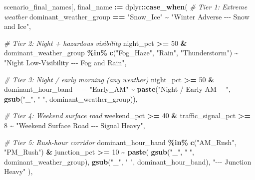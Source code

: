 \documentclass[
]{article}
\newenvironment{Shaded}{\begin{snugshade}}{\end{snugshade}}
\newcommand{\CommentTok}[1]{\textcolor[rgb]{0.56,0.35,0.01}{\textit{#1}}}
\newcommand{\DecValTok}[1]{\textcolor[rgb]{0.00,0.00,0.81}{#1}}
\newcommand{\FunctionTok}[1]{\textcolor[rgb]{0.13,0.29,0.53}{\textbf{#1}}}
\newcommand{\NormalTok}[1]{#1}
\newcommand{\SpecialCharTok}[1]{\textcolor[rgb]{0.81,0.36,0.00}{\textbf{#1}}}
\newcommand{\StringTok}[1]{\textcolor[rgb]{0.31,0.60,0.02}{#1}}
\begin{document}
\begin{Shaded}
\begin{Highlighting}[]
\NormalTok{scenario\_final\_names[, final\_name }\SpecialCharTok{:=}\NormalTok{ dplyr}\SpecialCharTok{::}\FunctionTok{case\_when}\NormalTok{(}
  \CommentTok{\# Tier 1: Extreme weather}
\NormalTok{  dominant\_weather\_group }\SpecialCharTok{==} \StringTok{"Snow\_Ice"} \SpecialCharTok{\textasciitilde{}}
    \StringTok{"Winter Adverse {-}{-}{-} Snow and Ice"}\NormalTok{,}

  \CommentTok{\# Tier 2: Night + hazardous visibility}
\NormalTok{  night\_pct }\SpecialCharTok{\textgreater{}=} \DecValTok{50} \SpecialCharTok{\&}
\NormalTok{    dominant\_weather\_group }\SpecialCharTok{\%in\%} \FunctionTok{c}\NormalTok{(}\StringTok{"Fog\_Haze"}\NormalTok{, }\StringTok{"Rain"}\NormalTok{, }\StringTok{"Thunderstorm"}\NormalTok{) }\SpecialCharTok{\textasciitilde{}}
    \StringTok{"Night Low{-}Visibility {-}{-}{-} Fog and Rain"}\NormalTok{,}

  \CommentTok{\# Tier 3: Night / early morning (any weather)}
\NormalTok{  night\_pct }\SpecialCharTok{\textgreater{}=} \DecValTok{50} \SpecialCharTok{\&}\NormalTok{ dominant\_hour\_band }\SpecialCharTok{==} \StringTok{"Early\_AM"} \SpecialCharTok{\textasciitilde{}}
    \FunctionTok{paste}\NormalTok{(}\StringTok{"Night / Early AM {-}{-}{-}"}\NormalTok{, }\FunctionTok{gsub}\NormalTok{(}\StringTok{"\_"}\NormalTok{, }\StringTok{" "}\NormalTok{, dominant\_weather\_group)),}

  \CommentTok{\# Tier 4: Weekend surface road}
\NormalTok{  weekend\_pct }\SpecialCharTok{\textgreater{}=} \DecValTok{40} \SpecialCharTok{\&}\NormalTok{ traffic\_signal\_pct }\SpecialCharTok{\textgreater{}=} \DecValTok{8} \SpecialCharTok{\textasciitilde{}}
    \StringTok{"Weekend Surface Road {-}{-}{-} Signal Heavy"}\NormalTok{,}

  \CommentTok{\# Tier 5: Rush{-}hour corridor}
\NormalTok{  dominant\_hour\_band }\SpecialCharTok{\%in\%} \FunctionTok{c}\NormalTok{(}\StringTok{"AM\_Rush"}\NormalTok{, }\StringTok{"PM\_Rush"}\NormalTok{) }\SpecialCharTok{\&}\NormalTok{ junction\_pct }\SpecialCharTok{\textgreater{}=} \DecValTok{10} \SpecialCharTok{\textasciitilde{}}
    \FunctionTok{paste}\NormalTok{(}
      \FunctionTok{gsub}\NormalTok{(}\StringTok{"\_"}\NormalTok{, }\StringTok{" "}\NormalTok{, dominant\_weather\_group),}
      \FunctionTok{gsub}\NormalTok{(}\StringTok{"\_"}\NormalTok{, }\StringTok{" "}\NormalTok{, dominant\_hour\_band),}
      \StringTok{"{-}{-}{-} Junction Heavy"}
\NormalTok{    ),}


\end{Highlighting}
\end{Shaded}
\end{document}

